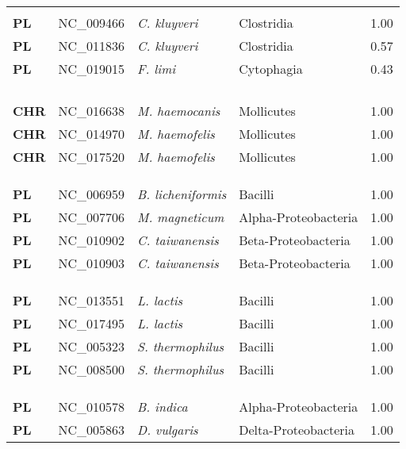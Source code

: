 \begin{adjustwidth}{-3cm}{2cm}
{\begin{supertabular}{>{\bfseries}l|p{0.1\textwidth}p{0.14\textwidth}l|l}
\hline\\
PL & NC\_009466 & \textit{C. kluyveri} & Clostridia & 1.00\\
PL & NC\_011836 & \textit{C. kluyveri} & Clostridia & 0.57\\
PL & NC\_019015 & \textit{F. limi} & Cytophagia & 0.43\\
\\
\\
\\
\hline\\
CHR & NC\_016638 & \textit{M. haemocanis} & Mollicutes & 1.00\\
CHR & NC\_014970 & \textit{M. haemofelis} & Mollicutes & 1.00\\
CHR & NC\_017520 & \textit{M. haemofelis} & Mollicutes & 1.00\\
\\
\\
\hline\\
PL & NC\_006959 & \textit{B. licheniformis} & Bacilli & 1.00\\
PL & NC\_007706 & \textit{M. magneticum} & Alpha-Proteobacteria & 1.00\\
PL & NC\_010902 & \textit{C. taiwanensis} & Beta-Proteobacteria & 1.00\\
PL & NC\_010903 & \textit{C. taiwanensis} & Beta-Proteobacteria & 1.00\\
\\
\\
\hline\\
PL & NC\_013551 & \textit{L. lactis} & Bacilli & 1.00\\
PL & NC\_017495 & \textit{L. lactis} & Bacilli & 1.00\\
PL & NC\_005323 & \textit{S. thermophilus} & Bacilli & 1.00\\
PL & NC\_008500 & \textit{S. thermophilus} & Bacilli & 1.00\\
\\
\\
\hline\\
PL & NC\_010578 & \textit{B. indica} & Alpha-Proteobacteria & 1.00\\
PL & NC\_005863 & \textit{D. vulgaris} & Delta-Proteobacteria & 1.00\\

\end{supertabular}}
\end{adjustwidth}
